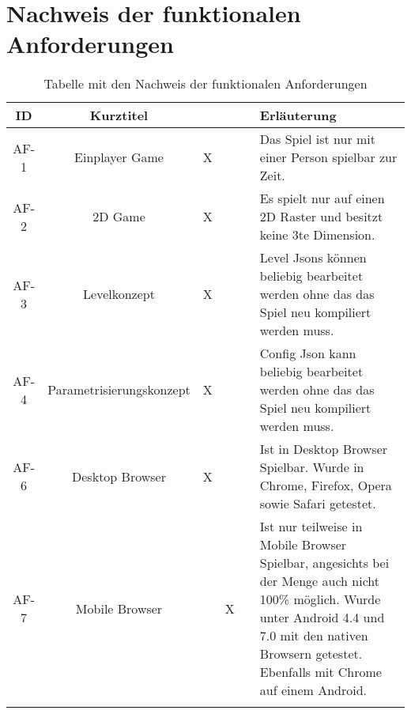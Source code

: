 \documentclass[a4paper,10pt]{report}
\begin{document}
    \section{Nachweis der funktionalen Anforderungen}
    {
        \begin{longtable}{|c|c|c|c|c|p{}|}
    	\hline
    	\textbf{ID} 								&
    	\textbf{Kurztitel}							&
    	{\rotatebox{90}{\textbf{Erfüllt 		}}} &
    	{\rotatebox{90}{\textbf{Teilw. erfüllt 	}}} &
    	{\rotatebox{90}{\textbf{Nicht erfüllt 	}}} &
		\textbf{Erläuterung} \\
    	\hline
     	AF-1 	& 	Einplayer Game				& 	X	& 		& 		& Das Spiel ist nur mit einer Person spielbar zur Zeit.  										\\
    	\hline
    	AF-2 	& 	2D Game						& 	X	& 		& 		& Es spielt nur auf einen 2D Raster und besitzt keine 3te Dimension. 							\\
    	\hline
    	AF-3 	& 	Levelkonzept				& 	X	& 		& 		& Level Jsons können beliebig bearbeitet werden ohne das das Spiel neu kompiliert werden muss.	\\
    	\hline
    	AF-4 	& 	Parametrisierungskonzept	& 	X	& 		& 		& Config Json kann beliebig bearbeitet werden ohne das das Spiel neu kompiliert werden muss.	\\
    	\hline
    	AF-6 	& 	Desktop Browser				& 	X	& 		& 		& Ist in Desktop Browser Spielbar. Wurde in Chrome, Firefox, Opera sowie Safari getestet.					\\
    	\hline
    	AF-7 	& 	Mobile Browser				& 		& 	X	& 		& Ist nur teilweise in Mobile Browser Spielbar, angesichts bei der Menge auch nicht 100\% möglich. 
    																	  Wurde unter Android 4.4 und 7.0 mit den nativen Browsern getestet. Ebenfalls mit Chrome auf einem Android. \\
    	\hline
    	\caption{Tabelle mit den Nachweis der funktionalen Anforderungen}   	 	
    	\end{longtable}
    }
    
	\newpage
\end{document}
